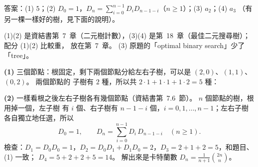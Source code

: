 \begin{pastsoln}
答案：(1) $5$；(2) $D_0 = 1$，$D_n = \sum_{i=0}^{n-1} D_i D_{n-1-i}$（$n \ge 1$）；(3) $a_2$；(4) $a_3$
（有另一棵一樣好的樹，見下面的說明）。

(1)(2) 是資結書第~7~章（二元樹計數），(3)(4) 是第~18~章（最佳二元搜尋樹）；配分 (1)(2) 比較重，
放在第~7~章。 (3) 原題的「optimal binary search」少了「tree」。

\textbf{(1)} 三個節點：根固定，剩下兩個節點分給左右子樹，可以是 $(2, 0)$、$(1, 1)$、$(0, 2)$。 兩個節點的
子樹有 $2$ 種，所以共 $2 \cdot 1 + 1 \cdot 1 + 1 \cdot 2 = 5$ 種：
\begin{center}
\end{center}

\textbf{(2)} 一樣看根之後左右子樹各有幾個節點（資結書第~7.6~節）。 $n$ 個節點的樹，根用掉一個，左子樹
有 $i$ 個、右子樹有 $n - 1 - i$ 個，$i = 0, 1, \ldots, n - 1$；左右子樹各自獨立地任選，所以
\[
D_0 = 1, \qquad D_n = \sum_{i=0}^{n-1} D_i\, D_{n-1-i} \quad (n \ge 1).
\]
檢查：$D_1 = D_0 D_0 = 1$，$D_2 = D_0 D_1 + D_1 D_0 = 2$，$D_3 = 2 + 1 + 2 = 5$，和題目、(1) 一致；
$D_4 = 5 + 2 + 2 + 5 = 14$。 解出來是卡特蘭數 $D_n = \frac{1}{n + 1}\binom{2n}{n}$。


\end{pastsoln}
